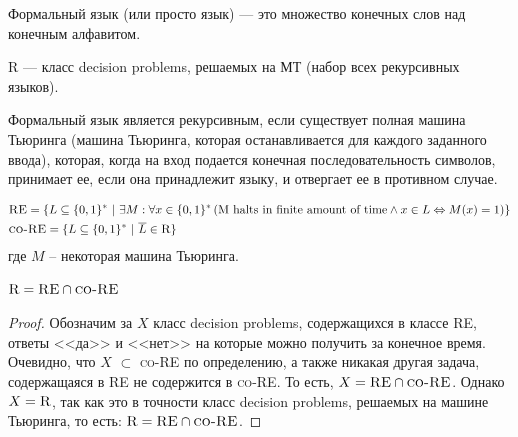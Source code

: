     \begin{Def}
        Формальный язык (или просто язык) --- это множество конечных слов над конечным алфавитом.
    \end{Def}

    \begin{Def}
        \textsc{R} --- класс decision problems, решаемых на МТ (набор всех рекурсивных языков). 
    \end{Def}

    \begin{Def} 
        Формальный язык является рекурсивным, если существует полная машина Тьюринга (машина Тьюринга, которая останавливается для каждого заданного ввода), которая, когда на вход подается конечная последовательность символов, принимает ее, если она принадлежит языку, и отвергает ее в противном случае. 
    \end{Def}

    \begin{Rem}
        \begin{align*}
            &\textsc{RE} = \{L \subseteq \{0, 1\}^* \ | \ \exists M : \forall x \in \{0, 1\}^* \left(\text{M halts in finite amount of time} \wedge x \in L \Leftrightarrow M(x) = 1\right)\} \\
            &\textsc{co-RE} = \{L \subseteq \{0, 1\}^* \ | \ \overline{L} \in \textsc{R}\}
        \end{align*}
        где $M$ -- некоторая машина Тьюринга.
    \end{Rem}

    \begin{Thm}
        $\textsc{R} = \textsc{RE} \cap \textsc{co-RE}$
    \end{Thm}
    \begin{proof}
        Обозначим за $X$ класс decision problems, содержащихся в классе \textsc{RE}, ответы <<да>> и <<нет>> на которые можно получить за конечное время. 
        Очевидно, что $X$ $\subset$ \textsc{co-RE} по определению, а также никакая другая задача, содержащаяся в \textsc{RE} не содержится в \textsc{co-RE}. 
        То есть, $X = \textsc{RE} \cap \textsc{co-RE}$. 
        Однако $X = \textsc{R}$, так как это в точности класс decision problems, решаемых на машине Тьюринга, то есть: $\textsc{R} = \textsc{RE} \cap \textsc{co-RE}$.
    \end{proof}
    
    
